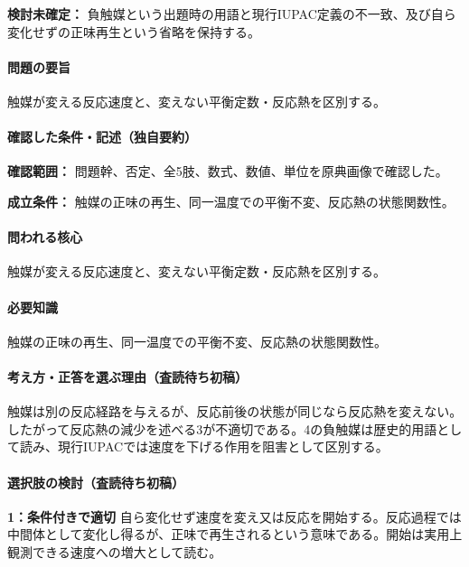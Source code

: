 \par\textbf{検討未確定：} 負触媒という出題時の用語と現行IUPAC定義の不一致、及び自ら変化せずの正味再生という省略を保持する。

\paragraph{問題の要旨} 触媒が変える反応速度と、変えない平衡定数・反応熱を区別する。

\paragraph{確認した条件・記述（独自要約）}\mbox{}\par

\noindent\textbf{確認範囲：} 問題幹、否定、全5肢、数式、数値、単位を原典画像で確認した。\par

\noindent\textbf{成立条件：} 触媒の正味の再生、同一温度での平衡不変、反応熱の状態関数性。\par

\paragraph{問われる核心} 触媒が変える反応速度と、変えない平衡定数・反応熱を区別する。

\paragraph{必要知識} 触媒の正味の再生、同一温度での平衡不変、反応熱の状態関数性。

\paragraph{考え方・正答を選ぶ理由（査読待ち初稿）} 触媒は別の反応経路を与えるが、反応前後の状態が同じなら反応熱を変えない。したがって反応熱の減少を述べる3が不適切である。4の負触媒は歴史的用語として読み、現行IUPACでは速度を下げる作用を阻害として区別する。

\paragraph{選択肢の検討（査読待ち初稿）}\mbox{}\par

\noindent\textbf{1：条件付きで適切} 自ら変化せず速度を変え又は反応を開始する。反応過程では中間体として変化し得るが、正味で再生されるという意味である。開始は実用上観測できる速度への増大として読む。\par

